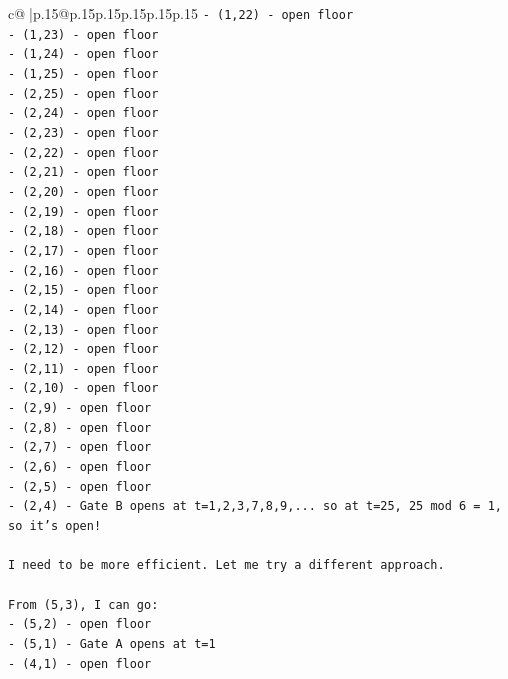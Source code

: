 \documentclass{article}
\begin{document}
{\begin{supertabular}{c@{$\;$}|p{.15\linewidth}@{}p{.15\linewidth}p{.15\linewidth}p{.15\linewidth}p{.15\linewidth}p{.15\linewidth}}
{{{\texttt{{-} (1,22) {-} open floor} \\
\texttt{{-} (1,23) {-} open floor} \\
\texttt{{-} (1,24) {-} open floor} \\
\texttt{{-} (1,25) {-} open floor} \\
\texttt{{-} (2,25) {-} open floor} \\
\texttt{{-} (2,24) {-} open floor} \\
\texttt{{-} (2,23) {-} open floor} \\
\texttt{{-} (2,22) {-} open floor} \\
\texttt{{-} (2,21) {-} open floor} \\
\texttt{{-} (2,20) {-} open floor} \\
\texttt{{-} (2,19) {-} open floor} \\
\texttt{{-} (2,18) {-} open floor} \\
\texttt{{-} (2,17) {-} open floor} \\
\texttt{{-} (2,16) {-} open floor} \\
\texttt{{-} (2,15) {-} open floor} \\
\texttt{{-} (2,14) {-} open floor} \\
\texttt{{-} (2,13) {-} open floor} \\
\texttt{{-} (2,12) {-} open floor} \\
\texttt{{-} (2,11) {-} open floor} \\
\texttt{{-} (2,10) {-} open floor} \\
\texttt{{-} (2,9) {-} open floor} \\
\texttt{{-} (2,8) {-} open floor} \\
\texttt{{-} (2,7) {-} open floor} \\
\texttt{{-} (2,6) {-} open floor} \\
\texttt{{-} (2,5) {-} open floor} \\
\texttt{{-} (2,4) {-} Gate B opens at t=1,2,3,7,8,9,... so at t=25, 25 mod 6 = 1, so it's open!} \\
\\ 
\texttt{I need to be more efficient. Let me try a different approach.} \\
\\ 
\texttt{From (5,3), I can go:} \\
\texttt{{-} (5,2) {-} open floor} \\
\texttt{{-} (5,1) {-} Gate A opens at t=1} \\
\texttt{{-} (4,1) {-} open floor} \\
}}}
\end{supertabular}}
\end{document}
